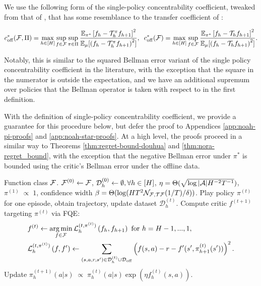 We use the following form of the single-policy concentrability coefficient, tweaked from that of \citet{zhan2022offline}, that has some resemblance to the transfer coefficient of \cite{song2023hybrid}:
\begin{defn}
    $$c_{{\operatorname{off}}}^*({\mathcal{F}},\Pi) = \max_{h\in[H]}\sup_{f \in {\mathcal{F}}} \sup_{\pi \in \Pi} \frac{\mathbb{E}_{\pi^*}\left[f_h-{\mathcal{T}}_h^{\pi}f_{h+1} \right]^2}{\mathbb{E}_{\mu}[\left(f_h-{\mathcal{T}}_h^{\pi}f_{h+1}\right)^2]}, \;\; c_{{\operatorname{off}}}^*({\mathcal{F}}) = \max_{h\in[H]}\sup_{f \in {\mathcal{F}}} \frac{\mathbb{E}_{\pi^*}\left[f_h-{\mathcal{T}}_h f_{h+1} \right]^2}{\mathbb{E}_{\mu}[\left(f_h-{\mathcal{T}}_h f_{h+1}\right)^2]}.$$
    \label{defn:single-policy-concentrability}
\end{defn}
Notably, this is similar to the squared Bellman error variant of the single policy concentrability coefficient in the literature, with the exception that the square in the numerator is outside the expectation, and we have an additional supremum over policies that the Bellman operator is taken with respect to in the first definition. 

With the definition of single-policy concentrability coefficient, we provide a guarantee for this procedure below, but defer the proof to Appendices \ref{app:noah-pi-proofs} and \ref{app:noah-star-proofs}. At a high level, the proofs proceed in a similar way to Theorems \ref{thm:regret-bound-douhua} and \ref{thm:nora-regret_bound}, with the exception that the negative Bellman error under $\pi^*$ is bounded using the critic's Bellman error under the offline data. 



\begin{algorithm}[t]
    \caption{}
    \begin{algorithmic}[1]
             Function class ${\mathcal{F}}$.
             ${\mathcal{F}}^{(0)} \leftarrow {\mathcal{F}}$, ${\mathcal{D}}_h^{(0)}\leftarrow \emptyset, \forall h \in [H]$, $\eta = \Theta(\sqrt{\log|{\mathcal{A}}| H^{-2}T^{-1}})$, $\pi^{(1)} \; \propto \; 1$, confidence width $\beta=\Theta(\log (HT^2 \mathcal{N}_{{\mathcal{F}}, {\mathcal{T}} {\mathcal{F}}}(1/T) / \delta))$.
            \STATE Play policy $\pi^{(t)}$ for one episode, obtain trajectory, update dataset $\mathcal{D}_h^{(t)}$. 
            \STATE Compute critic $f^{(t+1)}$ targeting $\pi^{(t)}$ via FQE:
            \begingroup
            \addtolength\jot{-1ex}
            \begin{align*}
                &f^{(t)} \leftarrow \operatorname*{arg\,min}_{f \in {\mathcal{F}}} \mathcal{L}_h^{(t,\pi^{(t)})}\left(f_h, f_{h+1}\right) \text{ for } h=H-1,...,1,\\
                &\mathcal{L}_h^{(t, \pi^{(t)})}\left(f, f'\right) \gets\sum_{\left(s, a, r, s^{\prime}\right) \in \mathcal{D}_h^{(t)}\cup{\mathcal{D}}_{{\operatorname{off}}}}\left(f(s, a)-r-f^{\prime}(s^{\prime}, \pi_{h+1}^{(t)}(s^\prime))\right)^2.
            \end{align*}
            \endgroup
        \STATE Update $\pi_h^{(t+1)}(a|s) \; \propto \; \pi_h^{(t)}(a|s)\exp(\eta f_h^{(t)}(s,a))$.
        \ENDFOR
    \end{algorithmic}
\label{alg:NOAH-pi}
\end{algorithm}


